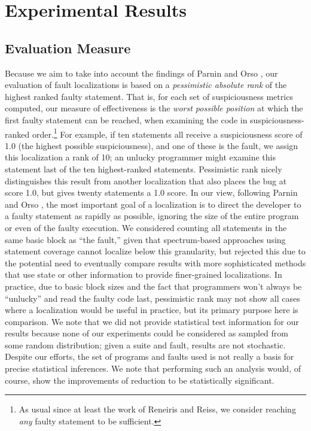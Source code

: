 \section{Experimental Results}
\label{sec:experiments}

\subsection{Evaluation Measure}

Because we aim to take into account the findings of Parnin and Orso
\cite{AutoHelp}, our evaluation of fault localizations is based on a
\emph{pessimistic absolute rank} of the highest ranked faulty
statement.  That is, for each set of suspiciousness metrics computed,
our measure of effectiveness is the \emph{worst possible position} at
which the first faulty statement can be reached, when examining the
code in suspiciousness-ranked order.\footnote{As usual since at least
the work of Reneiris and Reiss\cite{NearNeighbor}, we consider
reaching \emph{any} faulty statement to be sufficient.}  For example,
if ten statements all receive a suspiciousness score of 1.0 (the
highest possible suspiciousness), and one of these is the fault, we
assign this localization a rank of 10; an unlucky programmer might
examine this statement last of the ten highest-ranked statements.
Pessimistic rank nicely distinguishes this result from another
localization that also places the bug at score 1.0, but gives twenty
statements a 1.0 score. In our view, following Parnin and Orso
\cite{AutoHelp}, the most important goal of a localization is to
direct the developer to a faulty statement as rapidly as possible,
ignoring the size of the entire program or even of the faulty
execution.  We considered counting all statements in the same basic
block as ``the fault,'' given that spectrum-based approaches using
statement coverage cannot localize below this granularity, but
rejected this due to the potential need to eventually compare results
with more sophisticated methods that use state or other information to
provide finer-grained localizations.  In practice, due to basic block
sizes and the fact that programmers won't always be ``unlucky'' and
read the faulty code last, pessimistic rank may not show all cases
where a localization would be useful in practice, but its primary
purpose here is comparison.  We note that we did not provide
statistical test information for our results because none of our
experiments could be considered as sampled from some random
distribution; given a suite and fault, results are not stochastic.
Despite our efforts, the set of programs and faults used is not really
a basis for precise statistical inferences.  We note that performing
such an analysis would, of course, show the improvements of reduction
to be statistically significant.


